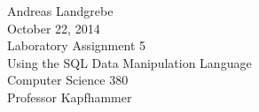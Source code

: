 \documentclass{article}
\begin{document}
\begin{center}
\Huge Andreas Landgrebe
\\
\Huge October 22, 2014
\\
\Huge Laboratory Assignment 5 
\\
Using the SQL Data Manipulation Language
\\
\Huge Computer Science 380
\\
\Huge Professor Kapfhammer

\end{center}
\end{document}
